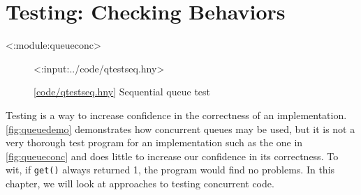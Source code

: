 \documentclass{report}
\newcommand{\harmonylink}[1]{%
[\href{https://harmony.cs.cornell.edu/#1}{\underline{#1}}]%
}
\newenvironment{code}{
\tcolorbox
}{
\endtcolorbox
}
\begin{document}
\chapter{Testing: Checking Behaviors}
\label{ch:testing}
<{:module:queueconc}>

\begin{figure}
\begin{code}
<{:input:../code/qtestseq.hny}>
\end{code}
\caption{\harmonylink{code/qtestseq.hny} Sequential queue test}
\label{fig:qtestseq}
\end{figure}

Testing is a way to increase confidence in the correctness
of an implementation.
\autoref{fig:queuedemo} demonstrates how concurrent queues
may be used, but it is not a very thorough test program
for an implementation such as the one in \autoref{fig:queueconc}
and does little to increase our confidence in its correctness.
To wit, if \texttt{get()} always returned 1, the program
would find no problems.
In this chapter, we will look at approaches to testing
concurrent code.

\end{document}
